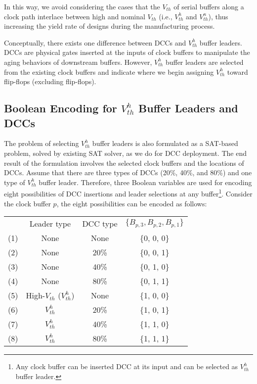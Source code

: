 In this way, we avoid considering the cases that the $V_{th}$ of serial buffers along a clock path interlace between high and nominal $V_{th}$ (i.e., $V_{th}^h$ and $V_{th}^n$), thus increasing the yield rate of designs during the manufacturing process.

Conceptually, there exists one difference between DCCs and $V_{th}^h$ buffer leaders. DCCs are physical gates inserted at the inputs of clock buffers to manipulate the aging behaviors of downstream buffers. However, $V_{th}^h$ buffer leaders are selected from the existing clock buffers and indicate where we begin assigning $V_{th}^h$ toward flip-flops (excluding flip-flops).

\subsection{Boolean Encoding for $V_{th}^h$ Buffer Leaders and DCCs}
The problem of selecting $V_{th}^h$ buffer leaders is also formulated as a SAT-based problem, solved by existing SAT solver, as we do for DCC deployment. The end result of the formulation involves the selected clock buffers and the locations of DCCs. Assume that there are three types of DCCs (20\%, 40\%, and 80\%) and one type of $V_{th}^h$ buffer leader. Therefore, three Boolean variables are used for encoding eight possibilities of DCC insertions and leader selections at any buffer\footnote{Any clock buffer can be inserted DCC at its input and can be selected as $V_{th}^h$ buffer leader.}. Consider the clock buffer $p$, the eight possibilities can be encoded as follows:

{\small
\begin{tabular}{  c  c  c  c  }
  	 & Leader type & DCC type & $\{B_{p,3}, B_{p,2}, B_{p,1}\}$ \\ 
  	(1)\quad & None & None & \{0, 0, 0\} \\ 
  	(2)\quad & None &20\% &  \{0, 0, 1\} \\ 
  	(3)\quad & None &40\% &  \{0, 1, 0\} \\ 
  	(4)\quad & None &80\% &  \{0, 1, 1\} \\ 
	(5)\quad & High-$V_{th}$ ($V_{th}^h$) & None & \{1, 0, 0\} \\ 
  	(6)\quad & $V_{th}^h$ & 20\% &  \{1, 0, 1\} \\ 
  	(7)\quad & $V_{th}^h$ & 40\% &  \{1, 1, 0\} \\ 
  	(8)\quad & $V_{th}^h$ & 80\% &  \{1, 1, 1\} \\ 
\end{tabular}}

